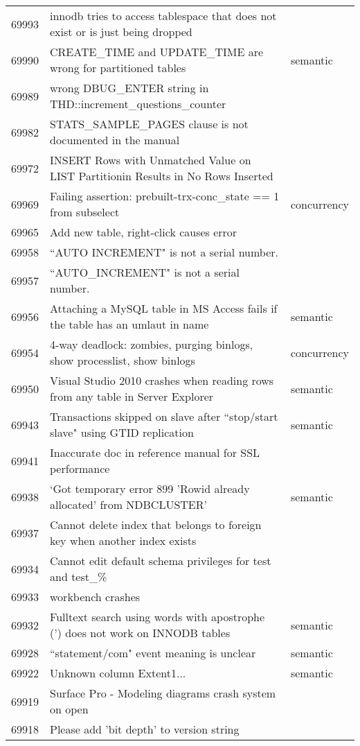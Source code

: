\begin{longtable}[c]{p{1cm}p{10cm}p{1cm}}
69993 & innodb tries to access tablespace that does not exist or is just being dropped &  \\
69990 & CREATE\_TIME and UPDATE\_TIME are wrong for partitioned tables & semantic \\
69989 & wrong DBUG\_ENTER string in THD::increment\_questions\_counter &  \\
69982 & STATS\_SAMPLE\_PAGES clause is not documented in the manual &  \\
69972 & INSERT Rows with Unmatched Value on LIST Partitionin Results in No Rows Inserted &  \\
69969 & Failing assertion: prebuilt-trx-conc\_state == 1 from subselect & concurrency \\
69965 & Add new table, right-click causes error &  \\
69958 & ``AUTO INCREMENT" is not a serial number. &  \\
69957 & ``AUTO\_INCREMENT" is not a serial number. &  \\
69956 & Attaching a MySQL table in MS Access fails if the table has an umlaut in name & semantic \\
69954 & 4-way deadlock: zombies, purging binlogs, show processlist, show binlogs & concurrency \\
69950 & Visual Studio 2010 crashes when reading rows from any table in Server Explorer & semantic \\
69943 & Transactions skipped on slave after ``stop/start slave" using GTID replication & semantic \\
69941 & Inaccurate doc in reference manual for SSL performance &  \\
69938 & `Got temporary error 899 'Rowid already allocated' from NDBCLUSTER' & semantic \\
69937 & Cannot delete index that belongs to foreign key when another index exists &  \\
69934 & Cannot edit default schema privileges for test and test\_\% &  \\
69933 & workbench crashes &  \\
69932 & Fulltext search using words with apostrophe (') does not work on INNODB tables & semantic \\
69928 & ``statement/com" event meaning is unclear & semantic \\
69922 & Unknown column Extent1... & semantic \\
69919 & Surface Pro - Modeling diagrams crash system on open &  \\
69918 & Please add 'bit depth' to version string &  \\

\end{longtable}

